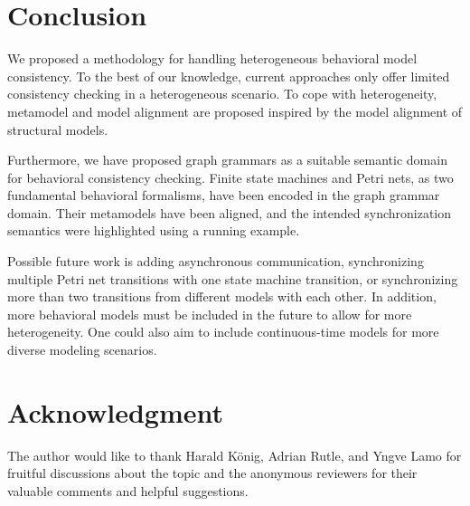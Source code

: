 \documentclass[conference]{IEEEtran}
\begin{document}
\section{Conclusion}
We proposed a methodology for handling heterogeneous behavioral model consistency.
To the best of our knowledge, current approaches only offer limited consistency checking in a heterogeneous scenario.
To cope with heterogeneity, metamodel and model alignment are proposed inspired by the model alignment of structural models.

Furthermore, we have proposed graph grammars as a suitable semantic domain for behavioral consistency checking.
Finite state machines and Petri nets, as two fundamental behavioral formalisms, have been encoded in the graph grammar domain.
Their metamodels have been aligned, and the intended synchronization semantics were highlighted using a running example.

Possible future work is adding asynchronous communication, synchronizing multiple Petri net transitions with one state machine transition, or synchronizing more than two transitions from different models with each other.
In addition, more behavioral models must be included in the future to allow for more heterogeneity.
One could also aim to include continuous-time models for more diverse modeling scenarios.

\section*{Acknowledgment}
The author would like to thank Harald König, Adrian Rutle, and Yngve Lamo for fruitful discussions about the topic and the anonymous reviewers for their valuable comments and helpful suggestions.



\end{document}
